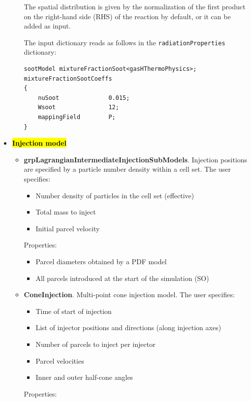 \documentclass[12pt]{article}
\begin{document}
\begin{itemize}
\begin{itemize}
        The spatial distribution is given by the normalization of the first product on the right-hand side (RHS) of the reaction by default, or it can be added as input.
        
        The input dictionary reads as follows in the \texttt{radiationProperties} dictionary:
        \begin{verbatim}
sootModel mixtureFractionSoot<gasHThermoPhysics>;
mixtureFractionSootCoeffs
{
    nuSoot              0.015;
    Wsoot               12;
    mappingField        P;
}
        \end{verbatim}
    \end{itemize}
%
   \item \textbf{\hl{Injection model}}
   \begin{itemize}
        \item \textbf{grpLagrangianIntermediateInjectionSubModels}.
        Injection positions are specified by a particle number density within a cell set.
        The user specifies:
        \begin{itemize}
            \item Number density of particles in the cell set (effective)
            \item Total mass to inject
            \item Initial parcel velocity
        \end{itemize}
        Properties:
        \begin{itemize}
            \item Parcel diameters obtained by a PDF model
            \item All parcels introduced at the start of the simulation (SO)
        \end{itemize}
        \item \textbf{ConeInjection}.
         Multi-point cone injection model.
        The user specifies:
        \begin{itemize}
            \item Time of start of injection
            \item List of injector positions and directions (along injection axes)
            \item Number of parcels to inject per injector
            \item Parcel velocities
            \item Inner and outer half-cone angles
        \end{itemize}
        Properties:

\end{itemize}
\end{itemize}
\end{document}

